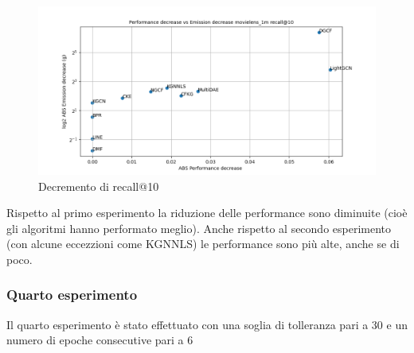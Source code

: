 \begin{figure}[H]
    \centering
     \includegraphics[width=\textwidth]{images/decrement_recall@10_movielens_1m_40_6.png}
    \caption{Decremento di recall@10}
\end{figure}

\noindent Rispetto al primo esperimento la riduzione delle performance sono diminuite (cioè gli algoritmi hanno performato meglio). Anche rispetto al secondo esperimento (con alcune eccezzioni come KGNNLS) le performance sono più alte, anche se di poco.




\subsubsection{Quarto esperimento}
Il quarto esperimento è stato effettuato con una soglia di tolleranza pari a 30 e un numero di epoche consecutive pari a 6



